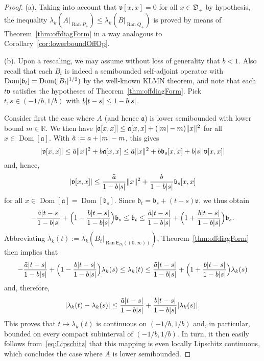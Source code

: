 \documentclass[11pt,a4paper]{amsart}
\numberwithin{equation}{section}
\DeclareMathOperator{\Ran}{Ran}
\DeclareMathOperator{\Dom}{Dom}
\DeclarePairedDelimiter{\abs}{|}{|}
\DeclarePairedDelimiter{\norm}{\lVert}{\rVert}
\newcommand{\RR}{\mathbb{R}}
\newcommand{\EE}{\mathsf{E}}
\newcommand{\fa}{{\mathfrak a}}
\newcommand{\fb}{{\mathfrak b}}
\newcommand{\fv}{{\mathfrak v}}
\newcommand{\fD}{{\mathfrak D}}
\theoremstyle{plain}
\theoremstyle{definition}
\theoremstyle{remark}
\begin{document}
\begin{proof}
  (a).
  Taking into account that $\fv[ x , x ] = 0$ for all $x \in \fD_+$ by hypothesis, the inequality
  $\lambda_k(A|_{\Ran P_+}) \le \lambda_k(B|_{\Ran Q_+})$ is proved by means of Theorem~\ref{thm:offdiagForm} in a way analogous
  to Corollary~\ref{cor:lowerboundOffOp}.

  (b).
  Upon a rescaling, we may assume without loss of generality that $b < 1$. Also recall that each $B_t$ is indeed a semibounded
  self-adjoint operator with $\Dom[\fb_t] = \Dom(\abs{B_t}^{1/2})$ by the well-known KLMN theorem, and note that each $t\fv$
  satisfies the hypotheses of Theorem~\ref{thm:offdiagForm}.
  Pick $t,s \in (-1/b , 1/b)$ with $b\abs{t-s} \le 1-b\abs{s}$.
  
  Consider first the case where $A$ (and hence $\fa$) is lower semibounded with lower bound $m \in \RR$. We then have
  $\abs{\fa[x,x]} \le \fa[x,x] + (\abs{m}-m)\norm{x}^2$ for all $x \in \Dom[\fa]$. With $\tilde{a} := a + \abs{m} - m$, this
  gives
  \begin{equation*}
    \abs{\fv[x,x]}
    \le
    \tilde{a}\norm{x}^2 + b\fa[x,x]
    \le
    \tilde{a}\norm{x}^2 + b\fb_s[x,x] + b\abs{s}\abs{\fv[x,x]}
  \end{equation*}
  and, hence,
  \begin{equation*}
    \abs{\fv[x,x]}
    \le
    \frac{\tilde{a}}{1-b\abs{s}}\norm{x}^2 + \frac{b}{1-b\abs{s}}\fb_s[x,x]
  \end{equation*}
  for all $x \in \Dom[\fa] = \Dom[\fb_s]$. Since $\fb_t = \fb_s + (t-s)\fv$, we thus obtain
  \begin{equation*}
    -\frac{\tilde{a}\abs{t-s}}{1-b\abs{s}} + \Bigl( 1 - \frac{b\abs{t-s}}{1-b\abs{s}} \Bigr) \fb_s
    \le
    \fb_t
    \le
    \frac{\tilde{a}\abs{t-s}}{1-b\abs{s}} + \Bigl( 1 + \frac{b\abs{t-s}}{1-b\abs{s}} \Bigr) \fb_s
    .
  \end{equation*}
  Abbreviating $\lambda_k(t):=\lambda_k(B_t|_{\Ran\EE_{B_t}((0,\infty))})$, Theorem~\ref{thm:offdiagForm} then implies that
  \begin{equation*}
    -\frac{\tilde{a}\abs{t-s}}{1-b\abs{s}} + \Bigl( 1 - \frac{b\abs{t-s}}{1-b\abs{s}} \Bigr) \lambda_k(s)
    \le
    \lambda_k(t)
    \le
    \frac{\tilde{a}\abs{t-s}}{1-b\abs{s}} + \Bigl( 1 + \frac{b\abs{t-s}}{1-b\abs{s}} \Bigr) \lambda_k(s)
  \end{equation*}
  and, therefore,
  \begin{equation}\label{eq:Lipschitz}
    \abs{\lambda_k(t) - \lambda_k(s)}
    \le
    \frac{\tilde{a}\abs{t-s}}{1-b\abs{s}} + \frac{b\abs{t-s}}{1-b\abs{s}} \abs{\lambda_k(s)}
    .
  \end{equation}
  This proves that $t \mapsto \lambda_k(t)$ is continuous on $(-1/b,1/b)$ and, in particular, bounded on every compact
  subinterval of $(-1/b , 1/b)$. In turn, it then easily follows from~\eqref{eq:Lipschitz} that this mapping is even locally
  Lipschitz continuous, which concludes the case where $A$ is lower semibounded.


\end{proof}
\end{document}
